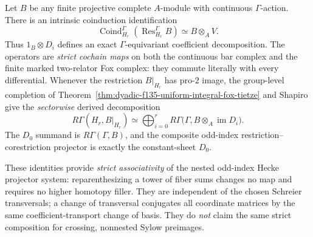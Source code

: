 \begin{theorem}
Let $B$ be any
finite projective
complete $A$-module
with continuous
$\Gamma$-action.
There is an
intrinsic
coinduction
identification
\begin{equation}\label{eq:dyadic-f135-coinduced-complete-flag}
\operatorname{Coind}_{H_r}^\Gamma
(\operatorname{Res}_{H_r}^\Gamma B)
\simeq B\otimes_A V.
\end{equation}
Thus
$1_B\otimes D_i$
defines an exact
$\Gamma$-equivariant
coefficient
decomposition.
The operators
are \emph{strict
cochain maps}
on both
the continuous
bar complex
and the finite
marked
two-relator
Fox complex:
they commute
literally with
every differential.
Whenever the
restriction
$B|_{H_r}$
has pro-$2$
image, the
group-level
completion of
Theorem~\ref{thm:dyadic-f135-uniform-integral-fox-tietze}
and Shapiro give
the \emph{sectorwise}
derived
decomposition
\begin{equation}\label{eq:dyadic-f135-derived-layer-decomposition}
\boxed{\quad
R\Gamma(H_r,B|_{H_r})
\simeq
\bigoplus_{i=0}^r
R\Gamma\bigl(
\Gamma,
B\otimes_A \operatorname{im}D_i
\bigr).
\quad}
\end{equation}
The $D_0$
summand is
$R\Gamma(\Gamma,B)$,
and the
composite
odd-index
restriction--corestriction
projector is
exactly the
constant-sheet
$D_0$.

These
identities provide
\emph{strict
associativity}
of the nested
odd-index
Hecke projector
system:
reparenthesizing
a tower of
fiber sums
changes no
map and
requires no
higher homotopy
filler.
They are
independent of
the chosen
Schreier
transversals;
a change of
transversal
conjugates all
coordinate
matrices by the
same
coefficient-transport
change of basis.
They do
\emph{not}
claim the same
strict
composition for
crossing,
nonnested
Sylow
preimages.
\end{theorem}

